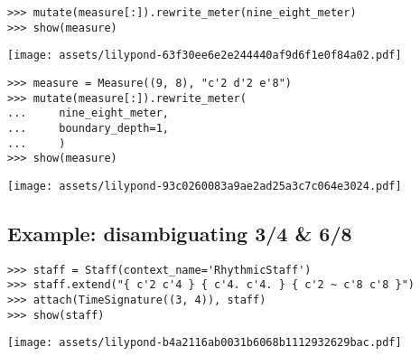 \begin{singlespacing}
\vspace{-0.5\baselineskip}
\begin{lstlisting}
>>> mutate(measure[:]).rewrite_meter(nine_eight_meter)
>>> show(measure)
\end{lstlisting}
\noindent\texttt{[image: assets/lilypond-63f30ee6e2e244440af9d6f1e0f84a02.pdf]}
\end{singlespacing}

\begin{comment}
<abjad>
measure = Measure((9, 8), "c'2 d'2 e'8")
mutate(measure[:]).rewrite_meter(
    nine_eight_meter,
    boundary_depth=1,
    )
show(measure)
</abjad>
\end{comment}

\begin{singlespacing}
\vspace{-0.5\baselineskip}
\begin{lstlisting}
>>> measure = Measure((9, 8), "c'2 d'2 e'8")
>>> mutate(measure[:]).rewrite_meter(
...     nine_eight_meter,
...     boundary_depth=1,
...     )
>>> show(measure)
\end{lstlisting}
\noindent\texttt{[image: assets/lilypond-93c0260083a9ae2ad25a3c7c064e3024.pdf]}
\end{singlespacing}

\subsection{Example: disambiguating 3/4 \& 6/8} %

\begin{comment}
<abjad>
staff = Staff(context_name='RhythmicStaff')
staff.extend("{ c'2 c'4 } { c'4. c'4. } { c'2 ~ c'8 c'8 }")
attach(TimeSignature((3, 4)), staff)
show(staff)
</abjad>
\end{comment}

\begin{singlespacing}
\vspace{-0.5\baselineskip}
\begin{lstlisting}
>>> staff = Staff(context_name='RhythmicStaff')
>>> staff.extend("{ c'2 c'4 } { c'4. c'4. } { c'2 ~ c'8 c'8 }")
>>> attach(TimeSignature((3, 4)), staff)
>>> show(staff)
\end{lstlisting}
\noindent\texttt{[image: assets/lilypond-b4a2116ab0031b6068b1112932629bac.pdf]}
\end{singlespacing}

